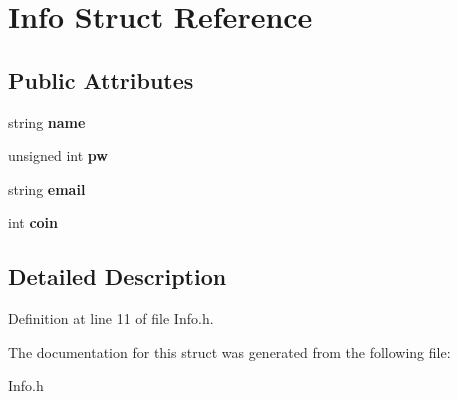 \hypertarget{struct_info}{}\section{Info Struct Reference}
\label{struct_info}
\subsection*{Public Attributes}
\begin{DoxyCompactItemize}
\item 
\hypertarget{struct_info_a1ac6e6a5e08ab37c0e1a33e2a859a1b0}{}string {\bfseries name}\label{struct_info_a1ac6e6a5e08ab37c0e1a33e2a859a1b0}

\item 
\hypertarget{struct_info_a60b78530f1c5f3424a01649abbdfc2cd}{}unsigned int {\bfseries pw}\label{struct_info_a60b78530f1c5f3424a01649abbdfc2cd}

\item 
\hypertarget{struct_info_a63bf25319c29332f3700a28753a62a9e}{}string {\bfseries email}\label{struct_info_a63bf25319c29332f3700a28753a62a9e}

\item 
\hypertarget{struct_info_aac9435493f1008475d027cee8ff8d1a8}{}int {\bfseries coin}\label{struct_info_aac9435493f1008475d027cee8ff8d1a8}

\end{DoxyCompactItemize}


\subsection{Detailed Description}


Definition at line 11 of file Info.\+h.



The documentation for this struct was generated from the following file\+:\begin{DoxyCompactItemize}
\item 
Info.\+h\end{DoxyCompactItemize}
